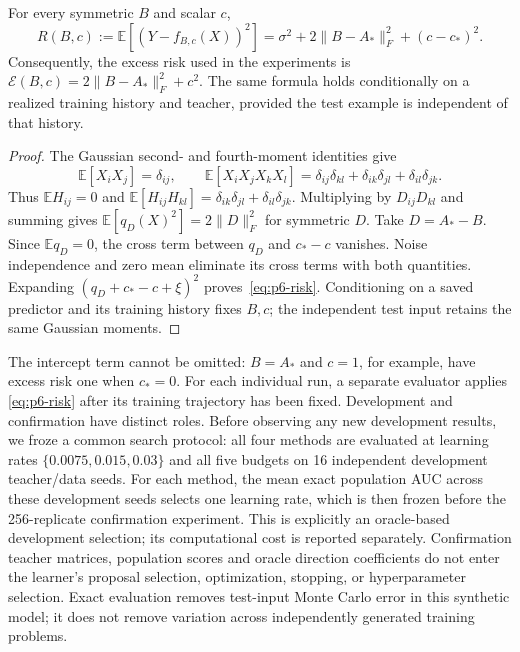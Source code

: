 \begin{proposition}
\label{prop:p6-risk}
For every symmetric $B$ and scalar $c$,
\begin{equation}
 R(B,c):=\mathbb E[(Y-f_{B,c}(X))^2]
 =\sigma^2+2\|B-A_*\|_F^2+(c-c_*)^2.
 \label{eq:p6-risk}
\end{equation}
Consequently, the excess risk used in the experiments is
$\mathcal E(B,c)=2\|B-A_*\|_F^2+c^2$.
The same formula holds conditionally on a realized training history and
teacher, provided the test example is independent of that history.
\end{proposition}
\begin{proof}
The Gaussian second- and fourth-moment identities give
\[
 \mathbb E[X_iX_j]=\delta_{ij},\qquad
 \mathbb E[X_iX_jX_kX_l]
 =\delta_{ij}\delta_{kl}+\delta_{ik}\delta_{jl}
  +\delta_{il}\delta_{jk}.
\]
Thus $\mathbb E H_{ij}=0$ and
$\mathbb E[H_{ij}H_{kl}]=\delta_{ik}\delta_{jl}
+\delta_{il}\delta_{jk}$. Multiplying by $D_{ij}D_{kl}$ and summing
gives $\mathbb E[q_D(X)^2]=2\|D\|_F^2$ for symmetric $D$.
Take $D=A_*-B$. Since $\mathbb E q_D=0$, the cross term between
$q_D$ and $c_*-c$ vanishes. Noise independence and zero mean eliminate
its cross terms with both quantities. Expanding
$(q_D+c_*-c+\xi)^2$ proves~\eqref{eq:p6-risk}.
Conditioning on a saved predictor and its training history fixes $B,c$;
the independent test input retains the same Gaussian moments.
\end{proof}

The intercept term cannot be omitted: $B=A_*$ and $c=1$, for example,
have excess risk one when $c_*=0$. For each individual run, a separate
evaluator applies \eqref{eq:p6-risk} after its training trajectory has
been fixed. Development and confirmation have distinct roles. Before
observing any new development results, we froze a common search protocol:
all four methods are evaluated at learning rates
$\{0.0075,0.015,0.03\}$ and all five budgets on 16 independent
development teacher/data seeds. For each method, the mean exact
population AUC across these development seeds selects one learning
rate, which is then frozen before the 256-replicate confirmation
experiment. This is explicitly an oracle-based development selection;
its computational cost is reported separately. Confirmation teacher
matrices, population scores and oracle direction coefficients do not
enter the learner's proposal selection, optimization, stopping, or
hyperparameter selection. Exact evaluation removes test-input Monte
Carlo error in this synthetic model; it does not remove variation
across independently generated training problems.

